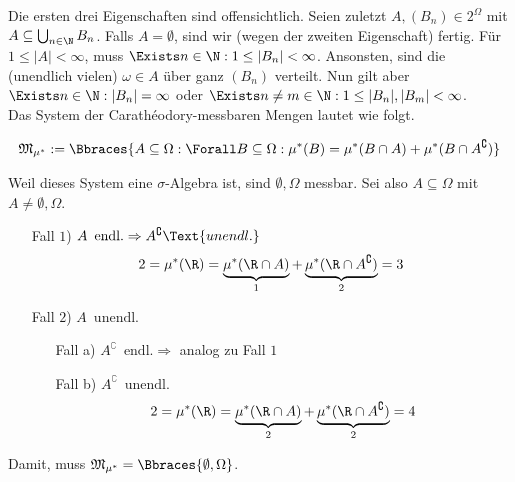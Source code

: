 \begin{solution}

Die ersten drei Eigenschaften sind offensichtlich. Seien zuletzt $A, (B_n) \in 2^\Omega$ mit $A \subseteq \bigcup_{n \in \N} B_n$. Falls $A = \emptyset$, sind wir (wegen der zweiten Eigenschaft) fertig. Für $1 \leq |A| < \infty$, muss $\Exists n \in \N: 1 \leq |B_n| < \infty$. Ansonsten, sind die (unendlich vielen) $\omega \in A$ über ganz $(B_n)$ verteilt. Nun gilt aber $\Exists n \in \N: |B_n| = \infty$ oder $\Exists n \neq m \in \N: 1 \leq |B_n|, |B_m| < \infty$. \\

Das System der Carathéodory-messbaren Mengen lautet wie folgt.

\begin{align*}
  \mathfrak{M}_{\mu^\ast} :=
  \Bbraces
  {
    A \subseteq \Omega:
    \Forall B \subseteq \Omega:
    \mu^\ast(B) = \mu^\ast(B \cap A) + \mu^\ast(B \cap A^\complement)
  }
\end{align*}

Weil dieses System eine $\sigma$-Algebra ist, sind $\emptyset, \Omega$ messbar. Sei also $A \subseteq \Omega$ mit $A \neq \emptyset, \Omega$.

\begin{itemize}

  \item[Fall $1$)] $A \enspace \text{endl.} \Rightarrow A^\complement \Text{unendl.}$
  \begin{align*}
    2 = \mu^\ast(\R) =
    \underbrace{\mu^\ast(\R \cap A)}_1 +
    \underbrace{\mu^\ast(\R \cap A^\complement)}_2 = 3
  \end{align*}

  \item[Fall $2$)] $A \enspace \text{unendl.}$
  \begin{itemize}
    \item[Fall a)] $A^\complement \enspace \text{endl.} \Rightarrow$ analog zu Fall $1$
    \item[Fall b)] $A^\complement \enspace \text{unendl.}$
    \begin{align*}
      2 = \mu^\ast(\R) =
      \underbrace{\mu^\ast(\R \cap A)}_2 +
      \underbrace{\mu^\ast(\R \cap A^\complement)}_2 = 4
    \end{align*}
  \end{itemize}

\end{itemize}

Damit, muss $\mathfrak{M}_{\mu^\ast} = \Bbraces{\emptyset, \Omega}$.

\end{solution}
